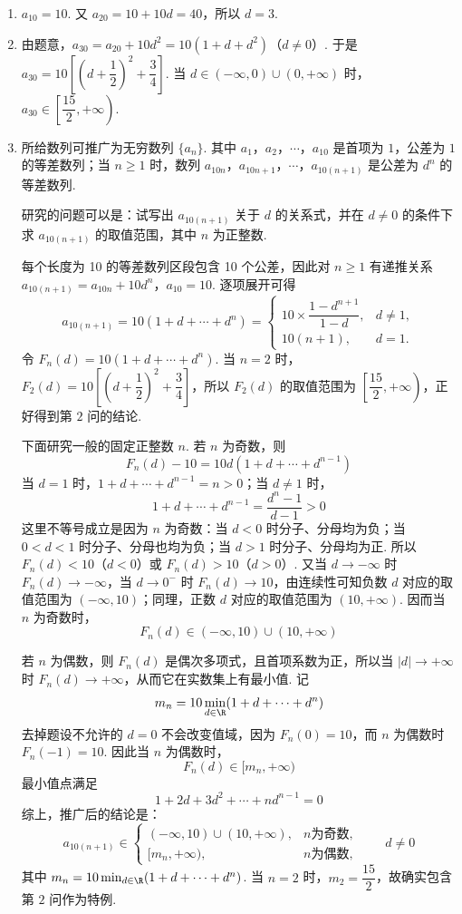 \begin{solution}
\begin{enumerate}
\item \(a_{10}=10\). 又 \(a_{20}=10+10d=40\)，所以 \(d=3\).

\item 由题意，\(a_{30}=a_{20}+10d^2=10(1+d+d^2)\)（\(d\ne0\)）. 于是 \(a_{30}=10\left[\left(d+\dfrac12\right)^2+\dfrac34\right]\). 当 \(d\in(-\infty,0)\cup(0,+\infty)\) 时，\(a_{30}\in\left[\dfrac{15}{2},+\infty\right)\).

\item 所给数列可推广为无穷数列 \(\{a_n\}\). 其中 \(a_1\)，\(a_2\)，\(\cdots\)，\(a_{10}\) 是首项为 \(1\)，公差为 \(1\) 的等差数列；当 \(n\ge1\) 时，数列 \(a_{10n}\)，\(a_{10n+1}\)，\(\cdots\)，\(a_{10(n+1)}\) 是公差为 \(d^n\) 的等差数列.

研究的问题可以是：试写出 \(a_{10(n+1)}\) 关于 \(d\) 的关系式，并在 \(d\ne0\) 的条件下求 \(a_{10(n+1)}\) 的取值范围，其中 \(n\) 为正整数.

每个长度为 10 的等差数列区段包含 10 个公差，因此对 \(n\ge1\) 有递推关系
\(a_{10(n+1)}=a_{10n}+10d^n\)，\(a_{10}=10\).
逐项展开可得
\[
a_{10(n+1)}=10(1+d+\cdots+d^n)=
\begin{cases}
10\times\dfrac{1-d^{n+1}}{1-d}, & d\ne1,\\
10(n+1), & d=1.
\end{cases}
\]
令 \(F_n(d)=10(1+d+\cdots+d^n)\). 当 \(n=2\) 时，\(F_2(d)=10\left[\left(d+\dfrac12\right)^2+\dfrac34\right]\)，所以 \(F_2(d)\) 的取值范围为 \(\left[\dfrac{15}{2},+\infty\right)\)，正好得到第 \(2\) 问的结论.

下面研究一般的固定正整数 \(n\). 若 \(n\) 为奇数，则
\[
F_n(d)-10=10d(1+d+\cdots+d^{n-1})
\]
当 \(d=1\) 时，\(1+d+\cdots+d^{n-1}=n>0\)；当 \(d\ne1\) 时，
\[
1+d+\cdots+d^{n-1}=\frac{d^n-1}{d-1}>0
\]
这里不等号成立是因为 \(n\) 为奇数：当 \(d<0\) 时分子、分母均为负；当 \(0<d<1\) 时分子、分母也均为负；当 \(d>1\) 时分子、分母均为正. 所以 \(F_n(d)<10\)（\(d<0\)）或 \(F_n(d)>10\)（\(d>0\)）. 又当 \(d\to-\infty\) 时 \(F_n(d)\to-\infty\)，当 \(d\to0^-\) 时 \(F_n(d)\to10\)，由连续性可知负数 \(d\) 对应的取值范围为 \((-\infty,10)\)；同理，正数 \(d\) 对应的取值范围为 \((10,+\infty)\). 因而当 \(n\) 为奇数时，
\[
F_n(d)\in(-\infty,10)\cup(10,+\infty)
\]

若 \(n\) 为偶数，则 \(F_n(d)\) 是偶次多项式，且首项系数为正，所以当 \(|d|\to+\infty\) 时 \(F_n(d)\to+\infty\)，从而它在实数集上有最小值. 记
\[
m_n=10\min_{d\in\R}(1+d+\cdots+d^n)
\]
去掉题设不允许的 \(d=0\) 不会改变值域，因为 \(F_n(0)=10\)，而 \(n\) 为偶数时 \(F_n(-1)=10\). 因此当 \(n\) 为偶数时，
\[
F_n(d)\in[m_n,+\infty)
\]
最小值点满足
\[
1+2d+3d^2+\cdots+nd^{n-1}=0
\]
综上，推广后的结论是：
\[
a_{10(n+1)}\in
\begin{cases}
(-\infty,10)\cup(10,+\infty), & n\text{为奇数},\\
[m_n,+\infty), & n\text{为偶数},
\end{cases}
\qquad d\ne0
\]
其中 \(m_n=10\min_{d\in\R}(1+d+\cdots+d^n)\). 当 \(n=2\) 时，\(m_2=\dfrac{15}{2}\)，故确实包含第 \(2\) 问作为特例.
\end{enumerate}
\end{solution}
